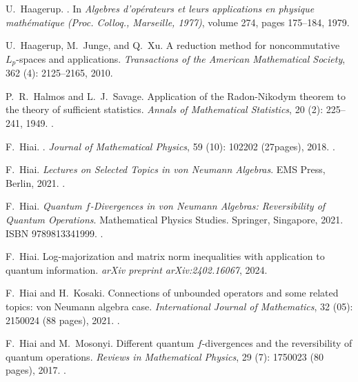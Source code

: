 \documentclass[12pt]{article}
\theoremstyle{definition}
\theoremstyle{remark}
\numberwithin{equation}{section}
\begin{document}
\begin{thebibliography}{27}
U.~Haagerup.
.
\newblock In \emph{Algebres d'op{\'e}rateurs et leurs applications en
  physique math{\'e}matique (Proc. Colloq., Marseille, 1977)}, volume 274,
  pages 175--184, 1979.
  
U.~Haagerup, M.~Junge, and Q.~Xu.
\newblock A reduction method for noncommutative $L_p$-spaces and applications.
\newblock \emph{Transactions of the American Mathematical Society}, 362
  (4): 2125--2165, 2010.


P.~R.~Halmos and L.~J.~Savage.
\newblock Application of the Radon-Nikodym theorem to the theory of sufficient statistics.
\newblock \emph{Annals of Mathematical Statistics}, 20 (2): 
225--241, 1949.
\newblock {}.


F.~Hiai.
.
\newblock \emph{Journal of Mathematical Physics}, 59 (10):
 102202 (27pages), 2018.
 \newblock {}.

F.~Hiai.
\newblock \emph{Lectures on Selected Topics in von Neumann Algebras}.
\newblock EMS Press, Berlin, 2021{}.
\newblock {}.

F.~Hiai.
\newblock \emph{Quantum $f$-Divergences in von Neumann Algebras: Reversibility
  of Quantum Operations}.
\newblock Mathematical Physics Studies. Springer, Singapore,
  2021{}.
\newblock ISBN 9789813341999.
\newblock {}.

F.~Hiai.
\newblock Log-majorization and matrix norm inequalities with application to quantum
information.
\newblock \emph{arXiv preprint arXiv:2402.16067}, 2024.

F.~Hiai and H.~Kosaki.
\newblock Connections of unbounded operators and some related topics: von
  {N}eumann algebra case.
\newblock \emph{International Journal of Mathematics}, 32
  (05): 2150024 (88 pages), 2021.
\newblock {}.

F.~Hiai and M.~Mosonyi.
\newblock Different quantum $f$-divergences and the reversibility of quantum
  operations.
\newblock \emph{Reviews in Mathematical Physics}, 29 (7):
  1750023 (80 pages), 2017.
\newblock {}.


\end{thebibliography}
\end{document}
